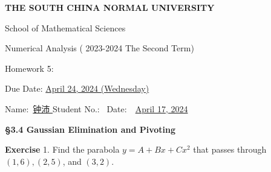 \documentclass[UTF8,12pt,hyperref]{ctexart}
\makeatletter
\newenvironment{exercise}[1][{\color{blue}\bf Exercise}]%
{%
 \begin{center}   \begin{lrbox}{\@tempboxa}%
    \begin{minipage}{\textwidth}%
  {\color{blue}\bfseries
#1}   }{%
    \end{minipage}%
    \end{lrbox}
    \colorbox{green}{\noindent\usebox{\@tempboxa}} \end{center}  
}
\makeatother
\begin{document}

\begin{center}
{\bf  THE SOUTH CHINA NORMAL UNIVERSITY\vspace{0.08cm}

School of Mathematical Sciences\vspace{0.08cm}
 
Numerical Analysis ( 2023-2024 The Second Term) \vspace{0.18cm}

{\Large Homework 5: }\vspace{0.18cm}

Due Date: \underline{April  24, 2024 (Wednesday)} }
\end{center}\vspace{-0.16cm}

\begin{center}
  Name:\ \underline{\qquad 钟沛 \hspace{1cm}}\hspace{0.298cm}  
  Student No.:\ \underline{\hspace{1cm}}  
%
Date:\ \ \underline{April 17, 2024} 
 \end{center}
 
 

 \begin{center}  \bf \Large
{\S 3.4 Gaussian Elimination and Pivoting}
\end{center} 

\begin{exercise}1. \quad   
 Find the parabola $y=A+Bx+Cx^2$ that passes through $(1, 6),(2, 5)$, and $(3, 2)$. 
 \end{exercise}
 
\end{document}
